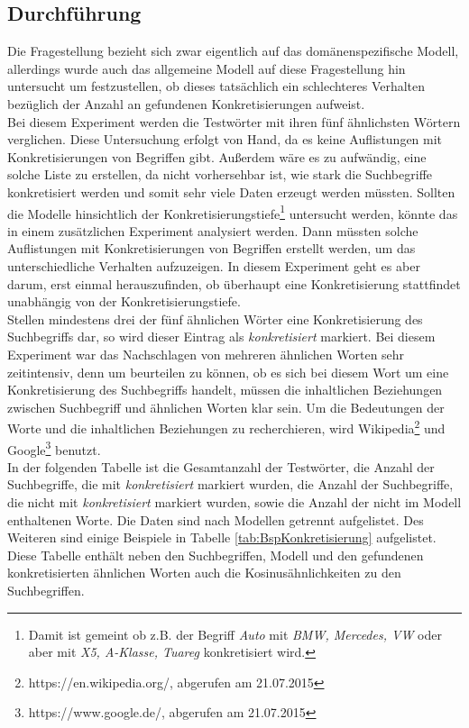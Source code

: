 \documentclass[12pt,a4paper]{report}
\begin{document}
		\subsection*{Durchführung}
		Die Fragestellung bezieht sich zwar eigentlich auf das domänenspezifische Modell, allerdings wurde auch das allgemeine Modell auf diese Fragestellung hin untersucht um festzustellen, ob dieses tatsächlich ein schlechteres Verhalten bezüglich der Anzahl an gefundenen Konkretisierungen aufweist.\\
		Bei diesem Experiment werden die Testwörter mit ihren fünf ähnlichsten Wörtern verglichen. Diese Untersuchung erfolgt von Hand, da es keine Auflistungen mit Konkretisierungen von Begriffen gibt. Außerdem wäre es zu aufwändig, eine solche Liste zu erstellen, da nicht vorhersehbar ist, wie stark die Suchbegriffe konkretisiert werden und somit sehr viele Daten erzeugt werden müssten. Sollten die Modelle hinsichtlich der Konkretisierungstiefe\footnote{Damit ist gemeint ob z.B. der Begriff \textit{Auto} mit \textit{BMW, Mercedes, VW} oder aber mit \textit{X5, A-Klasse, Tuareg} konkretisiert wird.} untersucht werden, könnte das in einem zusätzlichen Experiment analysiert werden. Dann müssten solche Auflistungen mit Konkretisierungen von Begriffen erstellt werden, um das unterschiedliche Verhalten aufzuzeigen. In diesem Experiment geht es aber darum, erst einmal herauszufinden, ob überhaupt eine Konkretisierung stattfindet unabhängig von der Konkretisierungstiefe.\\	
		 Stellen mindestens drei der fünf ähnlichen Wörter eine Konkretisierung des Suchbegriffs dar, so wird dieser Eintrag als \textit{konkretisiert} markiert. Bei diesem Experiment war das Nachschlagen von mehreren ähnlichen Worten sehr zeitintensiv, denn um beurteilen zu können, ob es sich bei diesem Wort um eine Konkretisierung des Suchbegriffs handelt, müssen die inhaltlichen Beziehungen zwischen Suchbegriff und ähnlichen Worten klar sein. Um die Bedeutungen der Worte und die inhaltlichen Beziehungen zu recherchieren, wird Wikipedia\footnote{https://en.wikipedia.org/, abgerufen am 21.07.2015} und Google\footnote{https://www.google.de/, abgerufen am 21.07.2015} benutzt.\\
		
		In der folgenden Tabelle ist die Gesamtanzahl der Testwörter, die Anzahl der Suchbegriffe, die mit \textit{konkretisiert} markiert wurden, die Anzahl der Suchbegriffe,  die nicht mit \textit{konkretisiert} markiert wurden, sowie die Anzahl der nicht im Modell enthaltenen Worte. Die Daten sind nach Modellen getrennt aufgelistet. Des Weiteren sind einige Beispiele in Tabelle \ref{tab:BspKonkretisierung} aufgelistet. Diese Tabelle enthält neben den Suchbegriffen, Modell und den gefundenen konkretisierten ähnlichen Worten auch die Kosinusähnlichkeiten zu den Suchbegriffen.
		
\end{document}
